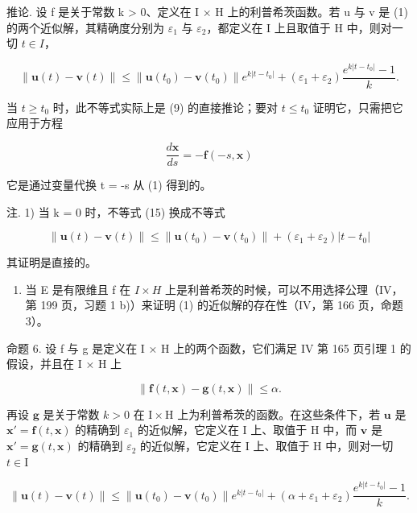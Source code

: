 推论. 设 f 是关于常数 k \textgreater{} 0、定义在 I × H 上的利普希茨函数。若 u 与 v 是 (1) 的两个近似解，其精确度分别为 \(\varepsilon_{1}\) 与 \(\varepsilon_{2}\)，都定义在 I 上且取值于 H 中，则对一切 \(t \in I\)，

\[
\| \mathbf {u} (t) - \mathbf {v} (t) \| \leqslant \| \mathbf {u} (t _ {0}) - \mathbf {v} (t _ {0}) \| e ^ {k | t - t _ {0} |} + (\varepsilon_ {1} + \varepsilon_ {2}) \frac {e ^ {k | t - t _ {0} |} - 1}{k}.\tag{15}
\]

当 \(t \geqslant t_0\) 时，此不等式实际上是 (9) 的直接推论；要对 \(t \leqslant t_0\) 证明它，只需把它应用于方程

\[
{\frac {d \mathbf {x}}{d s}} = - \mathbf {f} (- s, \mathbf {x})
\]

它是通过变量代换 t = -s 从 (1) 得到的。

注. 1) 当 k = 0 时，不等式 (15) 换成不等式

\[
\left\| \mathbf {u} (t) - \mathbf {v} (t) \right\| \leqslant \left\| \mathbf {u} \left(t _ {0}\right) - \mathbf {v} \left(t _ {0}\right) \right\| + \left(\varepsilon_ {1} + \varepsilon_ {2}\right) | t - t _ {0} |
\]

其证明是直接的。

\begin{enumerate}
\def\labelenumi{\arabic{enumi})}
\setcounter{enumi}{1}
\tightlist
\item
  当 E 是有限维且 f 在 \(I \times H\) 上是利普希茨的时候，可以不用选择公理（IV，第 199 页，习题 1 b)）来证明 (1) 的近似解的存在性（IV，第 166 页，命题 3）。
\end{enumerate}

命题 6. 设 f 与 g 是定义在 I × H 上的两个函数，它们满足 IV 第 165 页引理 1 的假设，并且在 I × H 上

\[
\left\| \mathbf {f} (t, \mathbf {x}) - \mathbf {g} (t, \mathbf {x}) \right\| \leqslant \alpha .\tag{16}
\]

再设 \(\mathbf{g}\) 是关于常数 \(k > 0\) 在 \(\mathrm{I} \times \mathrm{H}\) 上为利普希茨的函数。在这些条件下，若 \(\mathbf{u}\) 是 \(\mathbf{x}' = \mathbf{f}(t, \mathbf{x})\) 的精确到 \(\varepsilon_1\) 的近似解，它定义在 \(\mathrm{I}\) 上、取值于 \(\mathrm{H}\) 中，而 \(\mathbf{v}\) 是 \(\mathbf{x}' = \mathbf{g}(t, \mathbf{x})\) 的精确到 \(\varepsilon_2\) 的近似解，它定义在 \(\mathrm{I}\) 上、取值于 \(\mathrm{H}\) 中，则对一切 \(t \in \mathrm{I}\)

\[
\| \mathbf {u} (t) - \mathbf {v} (t) \| \leqslant \| \mathbf {u} (t _ {0}) - \mathbf {v} (t _ {0}) \| e ^ {k | t - t _ {0} |} + (\alpha + \varepsilon_ {1} + \varepsilon_ {2}) \frac {e ^ {k | t - t _ {0} |} - 1}{k}.\tag{17}
\]

